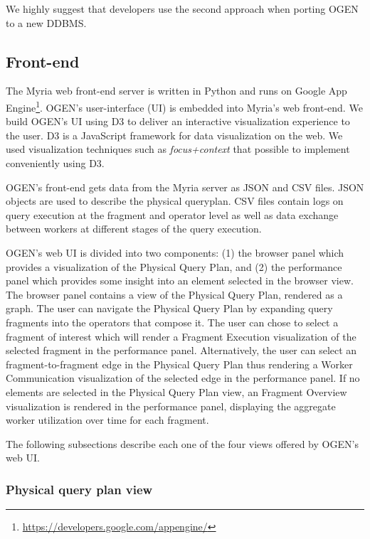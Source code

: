 \documentclass{chi2009}
\newcommand*{\system}{OGEN\xspace}
\newcommand*{\graph}{Physical Query Plan\xspace}
\newcommand*{\fragment}{Fragment Execution\xspace}
\newcommand*{\network}{Worker Communication\xspace}
\newcommand*{\overall}{Fragment Overview\xspace}
\begin{document}
We highly suggest that developers use the second approach when porting \system to a new DDBMS.

\subsection{Front-end}

The Myria web front-end server is written in Python and runs on Google App Engine\footnote{\url{https://developers.google.com/appengine/}}. \system's user-interface (UI) is embedded into Myria's web front-end. We build \system's UI using D3\cite{2011-d3} to deliver an interactive visualization experience to the user. D3 is a JavaScript framework for data visualization on the web. We used visualization techniques such as \emph{focus+context}\cite{furnas1986generalized} that possible to implement conveniently using D3.

\system's front-end gets data from the Myria server as JSON and CSV files. JSON objects are used to describe the physical queryplan. CSV files contain logs on query execution at the fragment and operator level as well as data exchange between workers at different stages of the query execution.

\system's web UI is divided into two components: (1) the browser panel which provides a visualization of the \graph, and (2) the performance panel which provides some insight into an element selected in the browser view. The browser panel contains a view of the \graph, rendered as a graph. The user can navigate the \graph by expanding query fragments into the operators that compose it. The user can chose to select a fragment of interest which will render a \fragment visualization of the selected fragment in the performance panel. Alternatively, the user can select an fragment-to-fragment edge in the \graph thus rendering a \network visualization of the selected edge in the performance panel. If no elements are selected in the \graph view, an \overall visualization is rendered in the performance panel, displaying the aggregate worker utilization over time for each fragment.

The following subsections describe each one of the four views offered by \system's web UI.


\subsubsection{Physical query plan view}
\end{document}
